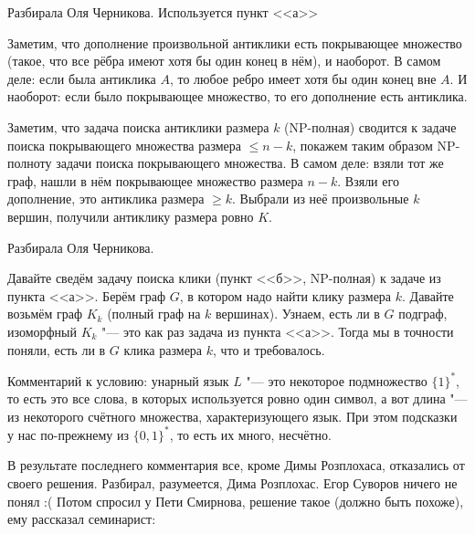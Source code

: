 	Разбирала Оля Черникова.
	Используется пункт <<а>>

	Заметим, что дополнение произвольной антиклики есть покрывающее множество (такое,
	что все рёбра имеют хотя бы один конец в нём), и наоборот.
	В самом деле: если была антиклика $A$, то любое ребро имеет хотя бы один конец вне $A$.
	И наоборот: если было покрывающее множество, то его дополнение есть антиклика.

	Заметим, что задача поиска антиклики размера $k$ (NP-полная) сводится к задаче поиска
	покрывающего множества размера $\le n-k$, покажем таким образом NP-полноту задачи
	поиска покрывающего множества.
	В самом деле: взяли тот же граф, нашли в нём покрывающее множество размера $n-k$.
	Взяли его дополнение, это антиклика размера $\ge k$.
	Выбрали из неё произвольные $k$ вершин, получили антиклику размера ровно $K$.

	Разбирала Оля Черникова.

	Давайте сведём задачу поиска клики (пункт <<б>>, NP-полная) к задаче из пункта <<а>>.
	Берём граф $G$, в котором надо найти клику размера $k$.
	Давайте возьмём граф $K_k$ (полный граф на $k$ вершинах).
	Узнаем, есть ли в $G$ подграф, изоморфный $K_k$ "--- это как раз задача из пункта <<а>>.
	Тогда мы в точности поняли, есть ли в $G$ клика размера $k$, что и требовалось.

	Комментарий к условию: унарный язык $L$ "--- это некоторое подмножество $\{1\}^*$,
	то есть это все слова, в которых используется ровно один символ, а вот длина "--- из некоторого
	счётного множества, характеризующего язык.
	При этом подсказки у нас по-прежнему из $\{0,1\}^*$, то есть их много, несчётно.

	В результате последнего комментария все, кроме Димы Розплохаса, отказались от своего решения.
	Разбирал, разумеется, Дима Розплохас.
	Егор Суворов ничего не понял :(
	Потом спросил у Пети Смирнова, решение такое (должно быть похоже), ему рассказал семинарист:

